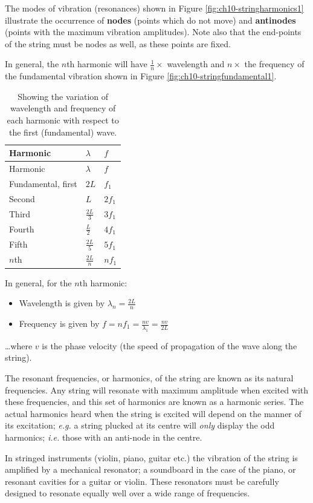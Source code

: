 \documentclass[
]{book}
\providecommand{\tightlist}{%
  \setlength{\itemsep}{0pt}\setlength{\parskip}{0pt}}
\begin{document}
The modes of vibration (resonances) shown in Figure \ref{fig:ch10-stringharmonics1} illustrate the occurrence of \textbf{nodes} (points which do not move) and \textbf{antinodes} (points with the maximum vibration amplitudes). Note also that the end-points of the string must be nodes as well, as these points are fixed.

In general, the \(n\)th harmonic will have \(\frac{1}{n} \times\) wavelength and \(n \times\) the frequency of the fundamental vibration shown in Figure \ref{fig:ch10-stringfundamental1}.

\begin{longtable}[]{@{}lll@{}}
\caption{\label{tab:ch10-standingfrequencies} Showing the variation of wavelength and frequency of each harmonic with respect to the first (fundamental) wave.}\tabularnewline
\toprule
Harmonic & \(\lambda\) & \(f\)\tabularnewline
\midrule
\endfirsthead
\toprule
Harmonic & \(\lambda\) & \(f\)\tabularnewline
\midrule
\endhead
Fundamental, first & \(2L\) & \(f_1\)\tabularnewline
Second & \(L\) & \(2f_1\)\tabularnewline
Third & \(\frac{2L}{3}\) & \(3f_1\)\tabularnewline
Fourth & \(\frac{L}{2}\) & \(4f_1\)\tabularnewline
Fifth & \(\frac{2L}{5}\) & \(5f_1\)\tabularnewline
\(n\)th & \(\frac{2L}{n}\) & \(nf_1\)\tabularnewline
\bottomrule
\end{longtable}

In general, for the \(n\)th harmonic:

\begin{itemize}
\tightlist
\item
  Wavelength is given by \(\lambda_n = \frac{2L}{n}\)
\item
  Frequency is given by \(f = nf_1 = \frac{nv}{\lambda_1} = \frac{nv}{2L}\)
\end{itemize}

\ldots where \(v\) is the phase velocity (the speed of propagation of the wave along the string).

The resonant frequencies, or harmonics, of the string are known as its natural frequencies. Any string will resonate with maximum amplitude when excited with these frequencies, and this set of harmonics are known as a harmonic series. The actual harmonics heard when the string is excited will depend on the manner of its excitation; \emph{e.g.} a string plucked at its centre will \emph{only} display the odd harmonics; \emph{i.e.} those with an anti-node in the centre.

In stringed instruments (violin, piano, guitar etc.) the vibration of the string is amplified by a mechanical resonator; a soundboard in the case of the piano, or resonant cavities for a guitar or violin. These resonators must be carefully designed to resonate equally well over a wide range of frequencies.
\end{document}
